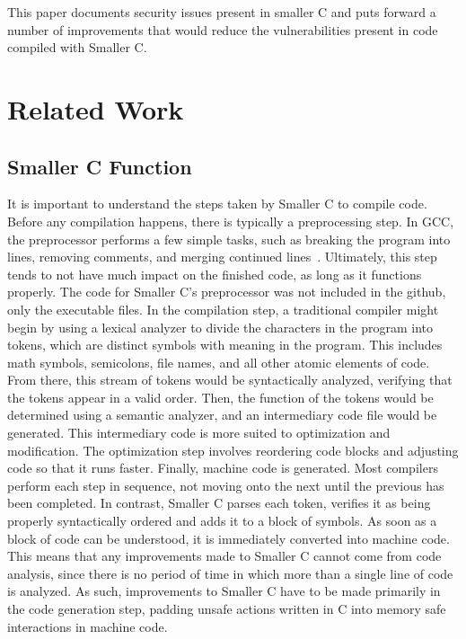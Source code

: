 \documentclass[sigconf, anonymous]{acmart}
\begin{document}
This paper documents security issues present in smaller C and puts forward a number of improvements that would reduce the vulnerabilities present in code compiled with Smaller C.

\section{Related Work}

\subsection{Smaller C Function}

It is important to understand the steps taken by Smaller C to compile code. Before any compilation happens, there is typically a preprocessing step. In GCC, the preprocessor performs a few simple tasks, such as breaking the program into lines, removing comments, and merging continued lines~\cite{GCC}. Ultimately, this step tends to not have much impact on the finished code, as long as it functions properly. The code for Smaller C’s preprocessor was not included in the github, only the executable files. In the compilation step, a traditional compiler might begin by using a lexical analyzer to divide the characters in the program into tokens, which are distinct symbols with meaning in the program. This includes math symbols, semicolons, file names, and all other atomic elements of code. From there, this stream of tokens would be syntactically analyzed, verifying that the tokens appear in a valid order. Then, the function of the tokens would be determined using a semantic analyzer, and an intermediary code file would be generated. This intermediary code is more suited to optimization and modification. The optimization step involves reordering code blocks and adjusting code so that it runs faster. Finally, machine code is generated. Most compilers perform each step in sequence, not moving onto the next until the previous has been completed. In contrast, Smaller C parses each token, verifies it as being properly syntactically ordered and adds it to a block of symbols. As soon as a block of code can be understood, it is immediately converted into machine code. This means that any improvements made to Smaller C cannot come from code analysis, since there is no period of time in which more than a single line of code is analyzed. As such, improvements to Smaller C have to be made primarily in the code generation step, padding unsafe actions written in C into memory safe interactions in machine code. 
\end{document}
